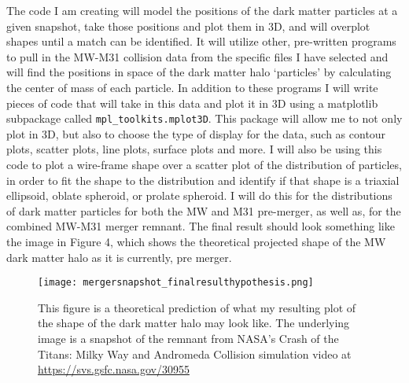 \documentclass{aastex63}
\begin{document}
The code I am creating will model the positions of the dark matter particles at a given snapshot, take those positions and plot them in 3D, and will overplot shapes until a match can be identified. It will utilize other, pre-written programs to pull in the MW-M31 collision data from the specific files I have selected and will find the positions in space of the dark matter halo ‘particles’ by calculating the center of mass of each particle. In addition to these programs I will write pieces of code that will take in this data and plot it in 3D using a matplotlib subpackage called \lstinline{mpl_toolkits.mplot3D}. This package will allow me to not only plot in 3D, but also to choose the type of display for the data, such as contour plots, scatter plots, line plots, surface plots and more. I will also be using this code to plot a wire-frame shape over a scatter plot of the distribution of particles, in order to fit the shape to the distribution and identify if that shape is a triaxial ellipsoid, oblate spheroid, or prolate spheroid. I will do this for the distributions of dark matter particles for both the MW and M31 pre-merger, as well as, for the combined MW-M31 merger remnant. The final result should look something like the image in Figure 4, which shows the theoretical projected shape of the MW dark matter halo as it is currently, pre merger.

\begin{figure}[ht!]
\begin{center}
\texttt{[image: mergersnapshot\_finalresulthypothesis.png]}
\caption{\label{fig:4}This figure is a theoretical prediction of what my resulting plot of the shape of the dark matter halo may look like. The underlying image is a snapshot of the remnant from NASA’s Crash of the Titans: Milky Way and Andromeda Collision simulation video at  \url{https://svs.gsfc.nasa.gov/30955}}
\end{center}
\end{figure}

\end{document}
